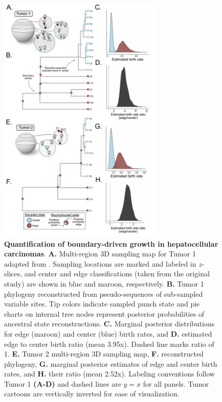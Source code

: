 \documentclass[12pt]{elife_based}
\begin{document}
\begin{figure}
    \centering
    \includegraphics[width=0.7\textwidth]{figures/fig5_wgs_aff_ML.pdf}

    \caption{\textbf{Quantification of boundary-driven growth in hepatocellular carcinomas}. 
    \textbf{A.} Multi-region 3D sampling map for Tumor 1 adapted from \cite{Li2022}. Sampling locations are marked and labeled in $z$-slices, and center and edge classifications (taken from the original study) are shown in blue and maroon, respectively. 
    \textbf{B.} Tumor 1 phylogeny reconstructed from pseudo-sequences of sub-sampled variable sites. Tip colors indicate sampled punch state and pie charts on internal tree nodes represent posterior probabilities of ancestral state reconstructions. 
    \textbf{C.} Marginal posterior distributions for edge (maroon) and center (blue) birth rates, and \textbf{D.} estimated edge to center birth ratio (mean 3.95x). Dashed line marks ratio of 1. \textbf{E.} Tumor 2 multi-region 3D sampling map, \textbf{F.} reconstructed phylogeny, \textbf{G.} marginal posterior estimates of edge and center birth rates, and \textbf{H.} their ratio (mean 2.52x). Labeling conventions follow Tumor 1 \textbf{(A-D)} and dashed lines are $y=x$ for all panels. Tumor cartoons are vertically inverted for ease of visualization.}
    
    \label{Fig5}
\end{figure} 
\end{document}

